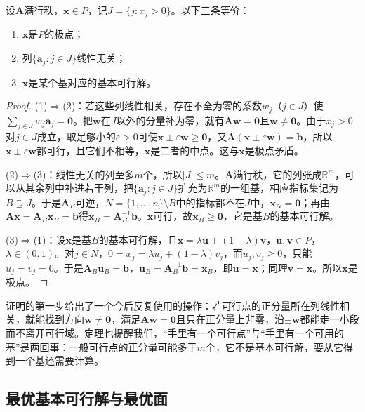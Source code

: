 \begin{theorem}[基本可行解与极点]
\label{thm:opt-lp-bfs-extreme}
设$\bm A$满行秩，$\bm x\in P$，记$J=\{j:x_j>0\}$。以下三条等价：
\begin{enumerate}
  \item $\bm x$是$P$的极点；
  \item 列$\{\bm a_j:j\in J\}$线性无关；
  \item $\bm x$是某个基对应的基本可行解。
\end{enumerate}
\end{theorem}

\begin{proof}
(1)$\Rightarrow$(2)：若这些列线性相关，存在不全为零的系数$w_j$（$j\in J$）使$\sum_{j\in J}w_j\bm a_j=\bm 0$。把$\bm w$在$J$以外的分量补为零，就有$\bm A\bm w=\bm 0$且$\bm w\ne\bm 0$。由于$x_j>0$对$j\in J$成立，取足够小的$\varepsilon>0$可使$\bm x\pm\varepsilon\bm w\ge\bm 0$，又$\bm A(\bm x\pm\varepsilon\bm w)=\bm b$，所以$\bm x\pm\varepsilon\bm w$都可行，且它们不相等，$\bm x$是二者的中点。这与$\bm x$是极点矛盾。

(2)$\Rightarrow$(3)：线性无关的列至多$m$个，所以$|J|\le m$。$\bm A$满行秩，它的列张成$\mathbb R^m$，可以从其余列中补进若干列，把$\{\bm a_j:j\in J\}$扩充为$\mathbb R^m$的一组基，相应指标集记为$B\supseteq J$。于是$\bm A_B$可逆，$N=\{1,\dots,n\}\setminus B$中的指标都不在$J$中，$\bm x_N=\bm 0$；再由$\bm A\bm x=\bm A_B\bm x_B=\bm b$得$\bm x_B=\bm A_B^{-1}\bm b$。$\bm x$可行，故$\bm x_B\ge\bm 0$，它是基$B$的基本可行解。

(3)$\Rightarrow$(1)：设$\bm x$是基$B$的基本可行解，且$\bm x=\lambda\bm u+(1-\lambda)\bm v$，$\bm u,\bm v\in P$，$\lambda\in(0,1)$。对$j\in N$，$0=x_j=\lambda u_j+(1-\lambda)v_j$，而$u_j,v_j\ge0$，只能$u_j=v_j=0$。于是$\bm A_B\bm u_B=\bm b$，$\bm u_B=\bm A_B^{-1}\bm b=\bm x_B$，即$\bm u=\bm x$；同理$\bm v=\bm x$。所以$\bm x$是极点。
\end{proof}

证明的第一步给出了一个今后反复使用的操作：若可行点的正分量所在列线性相关，就能找到方向$\bm w\ne\bm 0$，满足$\bm A\bm w=\bm 0$且只在正分量上非零，沿$\pm\bm w$都能走一小段而不离开可行域。定理也提醒我们，“手里有一个可行点”与“手里有一个可用的基”是两回事：一般可行点的正分量可能多于$m$个，它不是基本可行解，要从它得到一个基还需要计算。

\subsection{最优基本可行解与最优面}
\label{sec:opt-lp-optimal-bfs}

